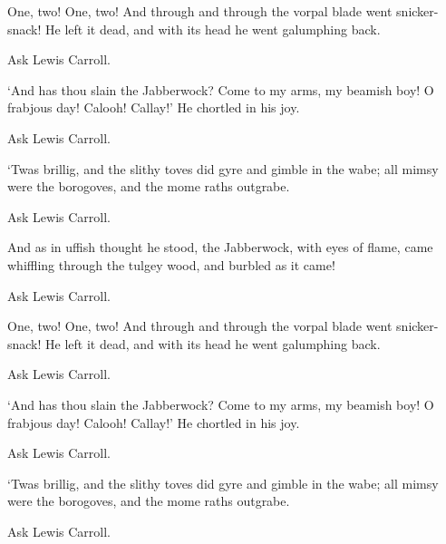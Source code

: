\documentclass[10pt]{examdesign}
\begin{document}
\begin{shortanswer}[title={Short Answer (10 pts each)},
                    rearrange=yes,resetcounter=no]
\begin{question}
  One, two! One, two! And through and through the vorpal blade went snicker-snack!
  He left it dead, and with its head he went galumphing back.
  \begin{answer}
    Ask Lewis Carroll.
  \end{answer}
\end{question}

\begin{question}
  `And has thou slain the Jabberwock? Come to my arms, my beamish boy!
  O frabjous day! Calooh! Callay!' He chortled in his joy.
  \begin{answer}
    Ask Lewis Carroll.
  \end{answer}
\end{question}

\begin{question}
  `Twas brillig, and the slithy toves did gyre and gimble in the wabe;
  all mimsy were the borogoves, and the mome raths outgrabe.
  \begin{answer}
    Ask Lewis Carroll.
  \end{answer}
\end{question}

\begin{question}
  And as in uffish thought he stood, the Jabberwock, with eyes of flame,
  came whiffling through the tulgey wood, and burbled as it came!
  \begin{answer}
    Ask Lewis Carroll.
  \end{answer}
\end{question}

\begin{question}
  One, two! One, two! And through and through the vorpal blade went snicker-snack!
  He left it dead, and with its head he went galumphing back.
  \begin{answer}
    Ask Lewis Carroll.
  \end{answer}
\end{question}

\begin{question}
  `And has thou slain the Jabberwock? Come to my arms, my beamish boy!
  O frabjous day! Calooh! Callay!' He chortled in his joy.
  \begin{answer}
    Ask Lewis Carroll.
  \end{answer}
\end{question}

\begin{question}
  `Twas brillig, and the slithy toves did gyre and gimble in the wabe;
  all mimsy were the borogoves, and the mome raths outgrabe.
  \begin{answer}
    Ask Lewis Carroll.
  \end{answer}
\end{question}


\end{shortanswer}
\end{document}
